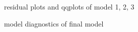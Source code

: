 \documentclass{article}
\begin{document}
\begin{center}
  \begin{figure}
    \caption{residual plots and qqplots of model 1, 2, 3}
  \end{figure}

  \begin{figure}
    \caption{model diagnostics of final model}
  \end{figure}


\end{center}
\end{document}
